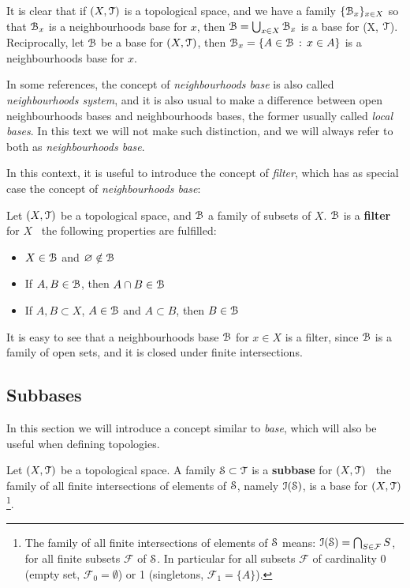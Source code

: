 It is clear that if $(X,\T)$ is a topological space, and we have a family
$\{\B_x\}_{x\in X}$ so that $\B_x$ is a neighbourhoods base for $x$, then
$\B=\bigcup_{x\in X}\B_x$ is a base for (X, $\T$).
Reciprocally, let $\B$ be a base for $(X, \T)$, then $\B_x = \setdef{A\in\B}{x\in A}$ is
a neighbourhoods base for $x$.

\begin{remark}
	In some references, the concept of \emph{neighbourhoods base} is also called
	\emph{neighbourhoods system}, and it is also usual to make a difference between
	open neighbourhoods bases and neighbourhoods bases, the former usually called
	\emph{local bases}. In this text we will not make such distinction, and we will
	always refer to both as \emph{neighbourhoods base}.
\end{remark}

In this context, it is useful to introduce the concept of \emph{filter},
which has as special case the concept of \emph{neighbourhoods base}:

\begin{definition}
	\label{def:filter}
	Let $(X, \T)$ be a topological space, and $\B$ a family of subsets of $X$. $\B$
	is a \textbf{filter} for $X$ \iff\ the following properties are fulfilled:
	\begin{itemize}
		\item $X\in\B$ and $\emptyset\notin\B$
		\item If $A, B\in\B$, then $A\cap B\in\B$
		\item If $A,B\subset X$, $A\in\B$ and $A\subset B$, then $B\in\B$
	\end{itemize}
\end{definition}

It is easy to see that a neighbourhoods base $\B$ for $x\in X$ is a filter, since
$\B$ is a family of open sets, and it is closed under finite intersections.


\subsection{Subbases}\label{subsec:subbases}

In this section we will introduce a concept similar to \emph{base}, which will also be
useful when defining topologies.

\begin{definition}
\label{def:subbase}
	Let $(X, \T)$ be a topological space.
	A family $\S\subset \T$ is a \textbf{subbase}	for $(X, \T)$ \iff\ the family of all finite intersections
	of elements of $\S$, namely	$\I(\S)$, is a base for $(X, \T)$\footnote{The family of all finite intersections of
	elements of $\S$ means: $\I(\S) = \bigcap_{S\in\mathcal{F}} S$, for all finite subsets $\mathcal{F}$ of $\S$. In particular for all subsets $\mathcal{F}$ of cardinality 0 (empty set, $\mathcal{F}_0=\emptyset$) or 1 (singletons, $\mathcal{F}_1=\{A\}$).}.
\end{definition}

